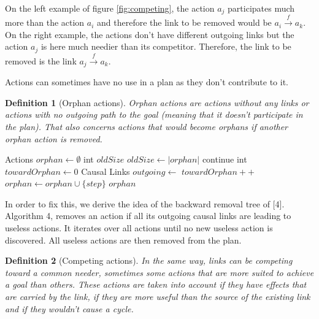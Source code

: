 \documentclass[]{article}
\newtheorem{definition}{Definition}
\begin{document}
On the left example of figure \ref{fig:competing}, the action \(a_j\)
participates much more than the action \(a_i\) and therefore the link to
be removed would be \(a_i \xrightarrow{f} a_k\). On the right example,
the actions don't have different outgoing links but the action \(a_j\)
is here much needier than its competitor. Therefore, the link to be
removed is the link \(a_j \xrightarrow{f} a_k\).

Actions can sometimes have no use in a plan as they don't contribute to
it.

\begin{definition}[Orphan actions]

Orphan actions are actions without any links or actions with no outgoing
path to the goal (meaning that it doesn't participate in the plan). That
also concerns actions that would become orphans if another orphan action
is removed.

\end{definition}

\begin{algorithm}\caption{Orphan actions finding}\label{orphanaction_find}\begin{algorithmic}[1]

\footnotesize
{} \State Actions
\(orphan \gets \emptyset\) \State int \(oldSize\) \Repeat
        \State \(oldSize \gets |orphan|\)
 
\State continue \EndIf
            \State int \(towardOrphan \gets 0\) \State Causal Links
\(outgoing \gets\) \State {}
 
\State \(towardOrphan ++\) \EndIf
            \EndFor
\State \(orphan \gets orphan \cup \{step\}\) \EndIf
        \EndFor
     \State \Return \(orphan\)
\EndFunction

\end{algorithmic}\end{algorithm}

In order to fix this, we derive the idea of the backward removal tree of
{[}4{]}. Algorithm 4, removes an action if all its outgoing causal links
are leading to useless actions. It iterates over all actions until no
new useless action is discovered. All useless actions are then removed
from the plan.

\begin{definition}[Competing actions]

In the same way, links can be competing toward a common needer,
sometimes some actions that are more suited to achieve a goal than
others. These actions are taken into account if they have effects that
are carried by the link, if they are more useful than the source of the
existing link and if they wouldn't cause a cycle.

\end{definition}
\end{document}
